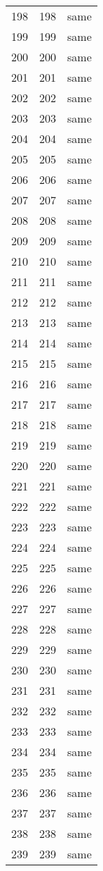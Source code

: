 \documentclass{article}%
\begin{document}
\begin{longtable}{lrl}
198 &  198 &  same \\
199 &  199 &  same \\
200 &  200 &  same \\
201 &  201 &  same \\
202 &  202 &  same \\
203 &  203 &  same \\
204 &  204 &  same \\
205 &  205 &  same \\
206 &  206 &  same \\
207 &  207 &  same \\
208 &  208 &  same \\
209 &  209 &  same \\
210 &  210 &  same \\
211 &  211 &  same \\
212 &  212 &  same \\
213 &  213 &  same \\
214 &  214 &  same \\
215 &  215 &  same \\
216 &  216 &  same \\
217 &  217 &  same \\
218 &  218 &  same \\
219 &  219 &  same \\
220 &  220 &  same \\
221 &  221 &  same \\
222 &  222 &  same \\
223 &  223 &  same \\
224 &  224 &  same \\
225 &  225 &  same \\
226 &  226 &  same \\
227 &  227 &  same \\
228 &  228 &  same \\
229 &  229 &  same \\
230 &  230 &  same \\
231 &  231 &  same \\
232 &  232 &  same \\
233 &  233 &  same \\
234 &  234 &  same \\
235 &  235 &  same \\
236 &  236 &  same \\
237 &  237 &  same \\
238 &  238 &  same \\
239 &  239 &  same \\

\end{longtable}
\end{document}
